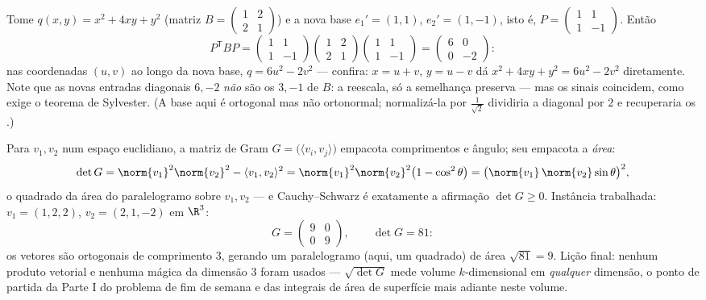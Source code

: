 \begin{example}\label{ex:b2:quadratic:congruence}
Tome $q(x, y) = x^2 + 4xy + y^2$ (matriz $B = \begin{pmatrix} 1
& 2\\ 2 & 1\end{pmatrix}$) e a nova base $e_1' = (1, 1)$,
$e_2' = (1, -1)$, isto é, $P = \begin{pmatrix} 1 & 1\\ 1 &
-1\end{pmatrix}$. Então
\[
P^{\mathsf T}BP
= \begin{pmatrix} 1 & 1\\ 1 & -1\end{pmatrix}
\begin{pmatrix} 1 & 2\\ 2 & 1\end{pmatrix}
\begin{pmatrix} 1 & 1\\ 1 & -1\end{pmatrix}
= \begin{pmatrix} 6 & 0\\ 0 & -2\end{pmatrix} :
\]
nas coordenadas $(u, v)$ ao longo da nova base, $q = 6u^2 -
2v^2$ --- confira: $x = u + v$, $y = u - v$ dá $x^2 + 4xy +
y^2 = 6u^2 - 2v^2$ diretamente. Note que as novas entradas diagonais $6,
-2$ \emph{não} são os  $3, -1$ de $B$: a 
reescala, só a semelhança preserva  --- mas os sinais
coincidem, como exige o teorema de Sylvester. (A base aqui é
ortogonal mas não ortonormal; normalizá-la por
$\frac{1}{\sqrt2}$ dividiria a diagonal por $2$ e
recuperaria os .)
\end{example}

\begin{example}\label{ex:b2:quadratic:gramarea}
Para $v_1, v_2$ num espaço euclidiano, a matriz de Gram $G =
\bigl(\langle v_i, v_j\rangle\bigr)$ empacota comprimentos e
ângulo; seu  empacota a \emph{área}:
\[
\det G = \norm{v_1}^2\norm{v_2}^2 - \langle v_1, v_2\rangle^2
= \norm{v_1}^2\norm{v_2}^2\bigl(1 - \cos^2\theta\bigr)
= \bigl(\norm{v_1}\,\norm{v_2}\sin\theta\bigr)^2 ,
\]
o quadrado da área do paralelogramo sobre $v_1, v_2$ ---
e Cauchy--Schwarz é exatamente a afirmação $\det G \geq 0$.
Instância trabalhada: $v_1 = (1, 2, 2)$, $v_2 = (2, 1, -2)$ em
$\R^3$:
\[
G = \begin{pmatrix} 9 & 0\\ 0 & 9 \end{pmatrix},
\qquad
\det G = 81 :
\]
os vetores são ortogonais de comprimento $3$, gerando um
paralelogramo (aqui, um quadrado) de área $\sqrt{81} = 9$.
Lição final: nenhum produto vetorial e nenhuma mágica da dimensão $3$
foram usados --- $\sqrt{\det G}$ mede volume $k$-dimensional
em \emph{qualquer} dimensão, o ponto de partida da Parte I do problema
de fim de semana e das integrais de área de superfície mais adiante neste
volume.
\end{example}

